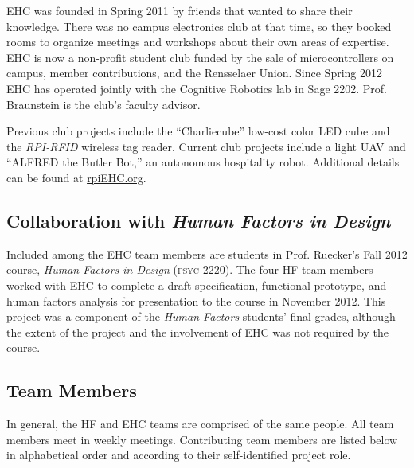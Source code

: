 \documentclass[12pt,oneside,final]{article}
\begin{document}
EHC was founded in Spring 2011 by friends that wanted to share their knowledge. There was no campus electronics club at that time, so they booked rooms to organize meetings and workshops about their own areas of expertise. EHC is now a non-profit student club funded by the sale of microcontrollers on campus, member contributions, and the Rensselaer Union. Since Spring 2012 EHC has operated jointly with the Cognitive Robotics lab in Sage 2202. Prof. Braunstein is the club's faculty advisor.

Previous club projects include the ``Charliecube'' low-cost color LED cube and the \emph{RPI-RFID} wireless tag reader. Current club projects include a light UAV and ``ALFRED the Butler Bot,'' an autonomous hospitality robot. Additional details can be found at \href{http://rpiEHC.org}{rpiEHC.org}.

\subsection{Collaboration with \emph{Human Factors in Design}}
Included among the EHC team members are students in Prof. Ruecker's Fall 2012 course, \emph{Human Factors in Design} (\textsc{psyc-2220}). The four HF team members worked with EHC to complete a draft specification, functional prototype, and human factors analysis for presentation to the course in November 2012. This project was a component of the \emph{Human Factors} students' final grades, although the extent of the project and the involvement of EHC was not required by the course.

\subsection{Team Members}
In general, the HF and EHC teams are comprised of the same people. All team members meet in weekly meetings. Contributing team members are listed below in alphabetical order and according to their self-identified project role. %
\end{document}
